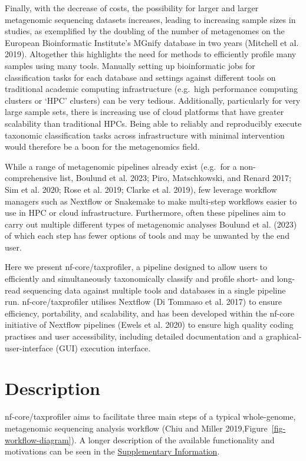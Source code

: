 \documentclass[
]{article}
\begin{document}
Finally, with the decrease of costs, the possibility for larger and
larger metagenomic sequencing datasets increases, leading to increasing
sample sizes in studies, as exemplified by the doubling of the number of
metagenomes on the European Bioinformatic Institute's MGnify database in
two years (Mitchell et al. 2019). Altogether this highlights the need
for methods to efficiently profile many samples using many tools.
Manually setting up bioinformatic jobs for classification tasks for each
database and settings against different tools on traditional academic
computing infrastructure (e.g.~high performance computing clusters or
`HPC' clusters) can be very tedious. Additionally, particularly for very
large sample sets, there is increasing use of cloud platforms that have
greater scalability than traditional HPCs. Being able to reliably and
reproducibly execute taxonomic classification tasks across
infrastructure with minimal intervention would therefore be a boon for
the metagenomics field.

While a range of metagenomic pipelines already exist (e.g.~for a
non-comprehensive list, Boulund et al. 2023; Piro, Matschkowski, and
Renard 2017; Sim et al. 2020; Rose et al. 2019; Clarke et al. 2019), few
leverage workflow managers such as Nextflow or Snakemake to make
multi-step workflows easier to use in HPC or cloud infrastructure.
Furthermore, often these pipelines aim to carry out multiple different
types of metagenomic analyses Boulund et al. (2023) of which each step
has fewer options of tools and may be unwanted by the end user.

Here we present nf-core/taxprofiler, a pipeline designed to allow users
to efficiently and simultaneously taxonomically classify and profile
short- and long-read sequencing data against multiple tools and
databases in a single pipeline run. nf-core/taxprofiler utilises
Nextflow (Di Tommaso et al. 2017) to ensure efficiency, portability, and
scalability, and has been developed within the nf-core initiative of
Nextflow pipelines (Ewels et al. 2020) to ensure high quality coding
practises and user accessibility, including detailed documentation and a
graphical-user-interface (GUI) execution interface.

\hypertarget{description}{%
\section{Description}\label{description}}

nf-core/taxprofiler aims to facilitate three main steps of a typical
whole-genome, metagenomic sequencing analysis workflow (Chiu and Miller
2019,Figure~\ref{fig-workflow-diagram}). A longer description of the
available functionality and motivations can be seen in the
\protect\hyperlink{supplementary-information}{Supplementary
Information}.
\end{document}
